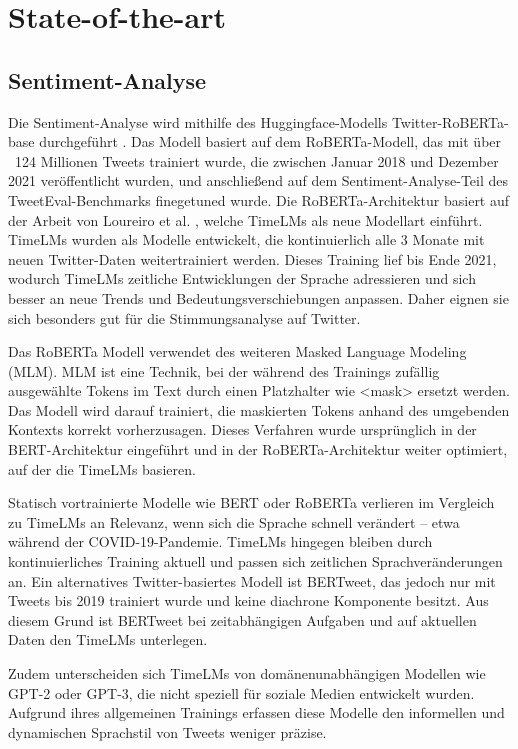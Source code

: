 \documentclass[conference,a4paper,flushend]{cs-techrep}
\begin{document}
\section{State-of-the-art}
\subsection{Sentiment-Analyse}
Die Sentiment-Analyse wird mithilfe des Huggingface-Modells Twitter-RoBERTa-base durchgeführt \cite{noauthor_cardiffnlptwitter-roberta-base-sentiment-latest_2024}. Das Modell basiert auf dem RoBERTa-Modell, das mit über ~124 Millionen Tweets trainiert wurde, die zwischen Januar 2018 und Dezember 2021 veröffentlicht wurden, und anschließend auf dem Sentiment-Analyse-Teil des TweetEval-Benchmarks finegetuned wurde. Die RoBERTa-Architektur basiert auf der Arbeit von Loureiro et al. \cite{loureiro_timelms_2022}, welche TimeLMs als neue Modellart einführt. TimeLMs wurden als Modelle entwickelt, die kontinuierlich alle 3 Monate mit neuen Twitter-Daten weitertrainiert werden. Dieses Training lief bis Ende 2021, wodurch TimeLMs zeitliche Entwicklungen der Sprache adressieren und sich besser an neue Trends und Bedeutungsverschiebungen anpassen. Daher eignen sie sich besonders gut für die Stimmungsanalyse auf Twitter.

Das RoBERTa Modell verwendet des weiteren Masked Language Modeling (MLM). MLM ist eine Technik, bei der während des Trainings zufällig ausgewählte Tokens im Text durch einen Platzhalter wie <mask> ersetzt werden. Das Modell wird darauf trainiert, die maskierten Tokens anhand des umgebenden Kontexts korrekt vorherzusagen. Dieses Verfahren wurde ursprünglich in der BERT-Architektur eingeführt und in der RoBERTa-Architektur weiter optimiert, auf der die TimeLMs basieren.

Statisch vortrainierte Modelle wie BERT oder RoBERTa verlieren im Vergleich zu TimeLMs an Relevanz, wenn sich die Sprache schnell verändert – etwa während der COVID-19-Pandemie. TimeLMs hingegen bleiben durch kontinuierliches Training aktuell und passen sich zeitlichen Sprachveränderungen an. Ein alternatives Twitter-basiertes Modell ist BERTweet, das jedoch nur mit Tweets bis 2019 trainiert wurde und keine diachrone Komponente besitzt. Aus diesem Grund ist BERTweet bei zeitabhängigen Aufgaben und auf aktuellen Daten den TimeLMs unterlegen.

Zudem unterscheiden sich TimeLMs von domänenunabhängigen Modellen wie GPT-2 oder GPT-3, die nicht speziell für soziale Medien entwickelt wurden. Aufgrund ihres allgemeinen Trainings erfassen diese Modelle den informellen und dynamischen Sprachstil von Tweets weniger präzise.
\end{document}
